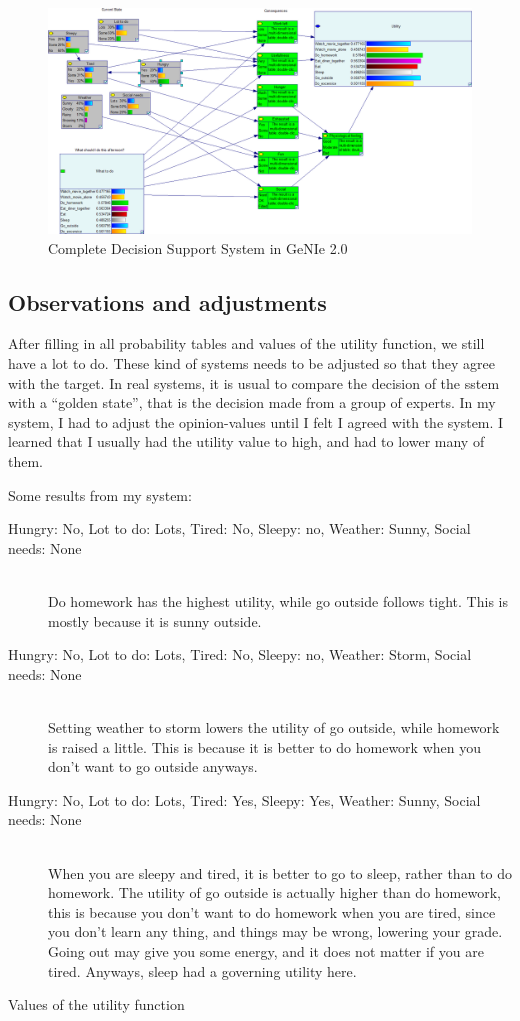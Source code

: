 \begin{figure}[h]
\includegraphics[width=154mm]{figure-complete.png}
\caption{Complete Decision Support System in GeNIe 2.0}
\label{fig:complete}
\end{figure}

\subsection{Observations and adjustments}
After filling in all probability tables and values of the utility function, we
still have a lot to do. These kind of systems needs to be adjusted so that they
agree with the target. In real systems, it is usual to compare the decision of
the sstem with a ``golden state'', that is the decision made from a group of
experts. In my system, I had to adjust the opinion-values until I felt I agreed
with the system. I learned that I usually had the utility value to high, and had
to lower many of them.

Some results from my system:\\
\begin{description}
\item[Hungry: No, Lot to do: Lots, Tired: No, Sleepy: no, Weather: Sunny,
Social needs: None]\\
Do homework has the highest utility, while go outside follows tight. This is
mostly because it is sunny outside.
\item[Hungry: No, Lot to do: Lots, Tired: No, Sleepy: no, Weather: Storm,
Social needs: None]\\
Setting weather to storm lowers the utility of go outside, while homework is
raised a little. This is because it is better to do homework when you don't want
to go outside anyways.
\item[Hungry: No, Lot to do: Lots, Tired: Yes, Sleepy: Yes, Weather: Sunny,
Social needs: None]\\
When you are sleepy and tired, it is better to go to sleep, rather than to do
homework. The utility of go outside is actually higher than do homework, this is
because you don't want to do homework when you are tired, since you don't learn
any thing, and things may be wrong, lowering your grade. Going out may give you
some energy, and it does not matter if you are tired. Anyways, sleep had a
governing utility here.
\end{description}


\begin{table}

\label{Some values from the utility function}
\caption{Values of the utility function}
\label{tab:utility}
\end{table}

